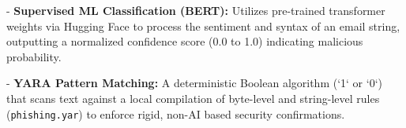 \documentclass[12pt,a4paper]{report}
\begin{document}
- \textbf{Supervised ML Classification (BERT):} Utilizes pre-trained transformer weights via Hugging Face to process the sentiment and syntax of an email string, outputting a normalized confidence score (0.0 to 1.0) indicating malicious probability.

- \textbf{YARA Pattern Matching:} A deterministic Boolean algorithm (`1` or `0`) that scans text against a local compilation of byte-level and string-level rules (\texttt{phishing.yar}) to enforce rigid, non-AI based security confirmations.
\end{document}
